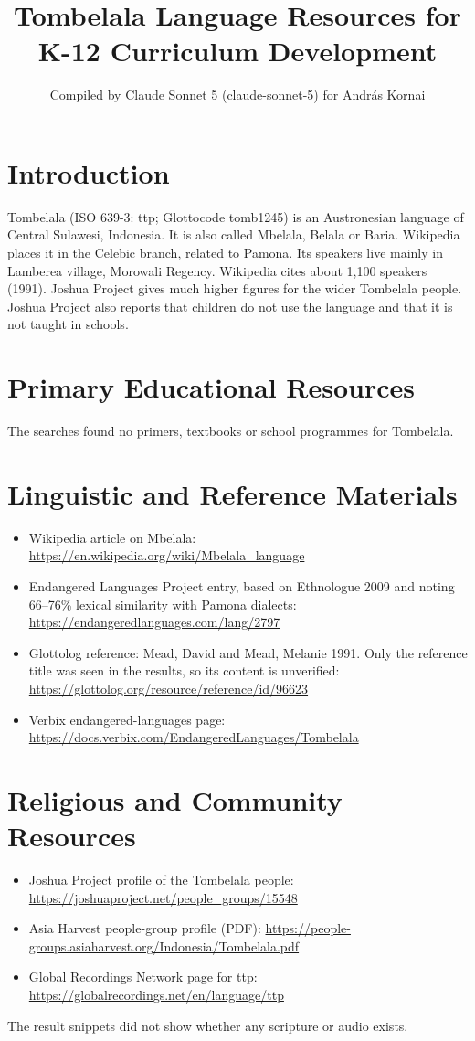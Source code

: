\documentclass[12pt]{article}
\title{Tombelala Language Resources for K-12 Curriculum Development}
\author{Compiled by Claude Sonnet 5 (claude-sonnet-5) for Andr\'as Kornai}
\date{}
\begin{document}
\maketitle

\section{Introduction}
Tombelala (ISO 639-3: ttp; Glottocode tomb1245) is an Austronesian language of Central Sulawesi, Indonesia. It is also called Mbelala, Belala or Baria. Wikipedia places it in the Celebic branch, related to Pamona. Its speakers live mainly in Lamberea village, Morowali Regency. Wikipedia cites about 1,100 speakers (1991). Joshua Project gives much higher figures for the wider Tombelala people. Joshua Project also reports that children do not use the language and that it is not taught in schools.

\section{Primary Educational Resources}
The searches found no primers, textbooks or school programmes for Tombelala.

\section{Linguistic and Reference Materials}
\begin{itemize}
\item Wikipedia article on Mbelala: \url{https://en.wikipedia.org/wiki/Mbelala_language}
\item Endangered Languages Project entry, based on Ethnologue 2009 and noting 66--76\% lexical similarity with Pamona dialects: \url{https://endangeredlanguages.com/lang/2797}
\item Glottolog reference: Mead, David and Mead, Melanie 1991. Only the reference title was seen in the results, so its content is unverified: \url{https://glottolog.org/resource/reference/id/96623}
\item Verbix endangered-languages page: \url{https://docs.verbix.com/EndangeredLanguages/Tombelala}
\end{itemize}

\section{Religious and Community Resources}
\begin{itemize}
\item Joshua Project profile of the Tombelala people: \url{https://joshuaproject.net/people_groups/15548}
\item Asia Harvest people-group profile (PDF): \url{https://people-groups.asiaharvest.org/Indonesia/Tombelala.pdf}
\item Global Recordings Network page for ttp: \url{https://globalrecordings.net/en/language/ttp}
\end{itemize}
The result snippets did not show whether any scripture or audio exists.
\end{document}
